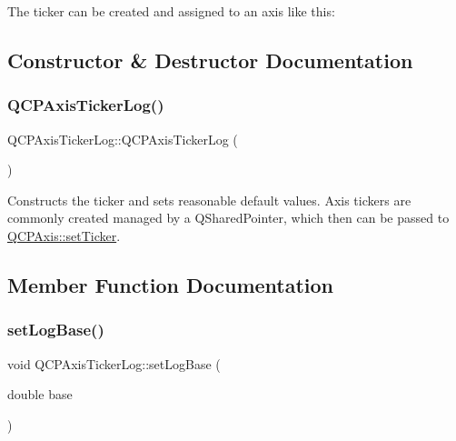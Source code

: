 The ticker can be created and assigned to an axis like this\+: 
\begin{DoxyCodeInclude}
\end{DoxyCodeInclude}


\subsection{Constructor \& Destructor Documentation}
\mbox{\label{classQCPAxisTickerLog_af3cb86ea5eef2023c0b96b5260c4cbdf}} 
\subsubsection{\texorpdfstring{Q\+C\+P\+Axis\+Ticker\+Log()}{QCPAxisTickerLog()}}
{\footnotesize\ttfamily Q\+C\+P\+Axis\+Ticker\+Log\+::\+Q\+C\+P\+Axis\+Ticker\+Log (\begin{DoxyParamCaption}{ }\end{DoxyParamCaption})}

Constructs the ticker and sets reasonable default values. Axis tickers are commonly created managed by a Q\+Shared\+Pointer, which then can be passed to \hyperlink{classQCPAxis_a4ee03fcd2c74d05cd1a419b9af5cfbdc}{Q\+C\+P\+Axis\+::set\+Ticker}. 

\subsection{Member Function Documentation}
\mbox{\label{classQCPAxisTickerLog_ac6e3b4e03baea3816f898869ab9751ef}} 
\subsubsection{\texorpdfstring{set\+Log\+Base()}{setLogBase()}}
{\footnotesize\ttfamily void Q\+C\+P\+Axis\+Ticker\+Log\+::set\+Log\+Base (\begin{DoxyParamCaption}\item[{double}]{base }\end{DoxyParamCaption})}

